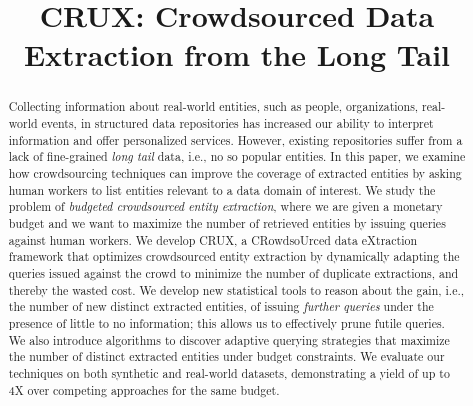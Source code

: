 \documentclass[conference]{IEEEtran}
\begin{document}

\title{CRUX: Crowdsourced Data Extraction from the Long Tail}
%

\author{
\and
{}
\and
{}
}

\maketitle

\begin{abstract}
Collecting information about real-world entities, such as people, organizations, real-world events, in structured data repositories has increased our ability to interpret information and offer personalized services. However, existing repositories suffer from a lack of fine-grained {\em long tail} data, i.e., no so popular entities. In this paper, we examine how crowdsourcing techniques can improve the coverage of extracted entities by asking human workers to list entities relevant to a data domain of interest. We study the problem of {\em budgeted crowdsourced entity extraction}, where we are given a monetary budget and we want to maximize the number of retrieved entities by issuing queries against human workers. We develop CRUX, a CRowdsoUrced data eXtraction framework that optimizes crowdsourced entity extraction by dynamically adapting the queries issued against the crowd to minimize the number of duplicate extractions, and thereby the wasted cost. We develop new statistical tools to reason about the gain, i.e., the number of new distinct extracted entities, of issuing {\em further queries} under the presence of little to no information; this allows us to effectively prune futile queries. We also introduce algorithms to discover adaptive querying strategies that maximize the number of distinct extracted entities under budget constraints. We evaluate our techniques on both synthetic and real-world datasets, demonstrating a yield of up to 4X over competing approaches for the same budget.
\end{abstract}
\end{document}
